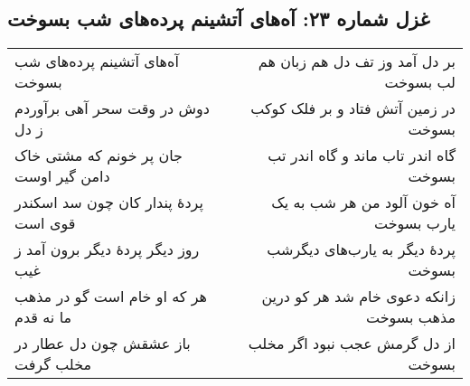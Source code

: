 \begin{center}
\section*{غزل شماره ۲۳: آه‌های آتشینم پرده‌های شب بسوخت}
\label{sec:023}
\begin{longtable}{l p{0.5cm} r}
آه‌های آتشینم پرده‌های شب بسوخت
&&
بر دل آمد وز تف دل هم زبان هم لب بسوخت
\\
دوش در وقت سحر آهی برآوردم ز دل
&&
در زمین آتش فتاد و بر فلک کوکب بسوخت
\\
جان پر خونم که مشتی خاک دامن گیر اوست
&&
گاه اندر تاب ماند و گاه اندر تب بسوخت
\\
پردهٔ پندار کان چون سد اسکندر قوی است
&&
آه خون آلود من هر شب به یک یارب بسوخت
\\
روز دیگر پردهٔ دیگر برون آمد ز غیب
&&
پردهٔ دیگر به یارب‌های دیگرشب بسوخت
\\
هر که او خام است گو در مذهب ما نه قدم
&&
زانکه دعوی خام شد هر کو درین مذهب بسوخت
\\
باز عشقش چون دل عطار در مخلب گرفت
&&
از دل گرمش عجب نبود اگر مخلب بسوخت
\\
\end{longtable}
\end{center}
